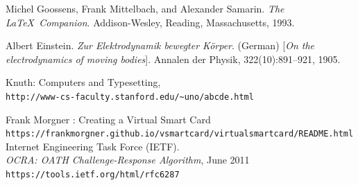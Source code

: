 \documentclass[bsc,frontabs,twoside,singlespacing,parskip,deptreport]{infthesis}     %
\begin{document}

%
\begin{thebibliography}{}

Michel Goossens, Frank Mittelbach, and Alexander Samarin. 
\textit{The \LaTeX\ Companion}. 
Addison-Wesley, Reading, Massachusetts, 1993.
 
Albert Einstein. 
\textit{Zur Elektrodynamik bewegter K{\"o}rper}. (German) 
[\textit{On the electrodynamics of moving bodies}]. 
Annalen der Physik, 322(10):891–921, 1905.
 
Knuth: Computers and Typesetting,
\\\texttt{http://www-cs-faculty.stanford.edu/\~{}uno/abcde.html}

Frank Morgner : Creating a Virtual Smart Card\\
\texttt{https://frankmorgner.github.io/vsmartcard/virtualsmartcard/README.html}\\

Internet Engineering Task Force (IETF).\\
\textit{OCRA: OATH Challenge-Response Algorithm}, June 2011\\
\texttt{https://tools.ietf.org/html/rfc6287}


\end{thebibliography}
\end{document}
